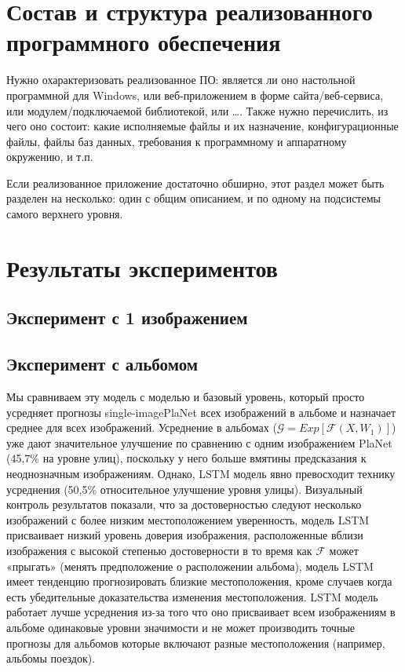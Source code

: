 \section{Состав и структура реализованного программного обеспечения}

Нужно охарактеризовать реализованное ПО: является ли оно настольной программной для Windows, или веб-приложением в форме сайта/веб-сервиса, или модулем/подключаемой библиотекой, или \dots. Также нужно перечислить, из чего оно состоит: какие исполняемые файлы и их назначение, конфигурационные файлы, файлы баз данных, требования к программному и аппаратному окружению, и т.п.

Если реализованное приложение достаточно обширно, этот раздел может быть
разделен на несколько: один с общим описанием, и по одному на подсистемы самого
верхнего уровня.
\section{Результаты экспериментов}

\subsection{Эксперимент с 1 изображением}


\subsection{Эксперимент с альбомом} Мы сравниваем эту модель с моделью и базовый уровень, который просто усредняет прогнозы single-imagePlaNet всех изображений в альбоме и назначает
среднее для всех изображений. Усреднение в альбомах ($ \mathcal{G}= Exp[ \mathcal{F}(X,W_1) ] $) уже
дают значительное улучшение по сравнению с одним изображением PlaNet
(45,7\% на уровне улиц), поскольку у него больше
вмятины предсказания к неоднозначным изображениям. Однако, LSTM
модель явно превосходит технику усреднения (50,5\%
относительное улучшение уровня улицы). Визуальный контроль
результатов показали, что за достоверностью следуют несколько изображений с более низким местоположением уверенность, модель LSTM присваивает низкий уровень доверия изображения, расположенные вблизи изображения с высокой степенью достоверности в то время как $ \mathcal{F} $ может «прыгать» (менять предположение о расположении альбома), модель LSTM имеет тенденцию прогнозировать близкие местоположения, кроме случаев когда есть убедительные доказательства изменения местоположения. LSTM модель работает лучше усреднения из-за того что оно присваивает всем изображениям в альбоме одинаковые уровни значимости и не может производить точные прогнозы для альбомов которые включают разные местоположения (например, альбомы поездок).


